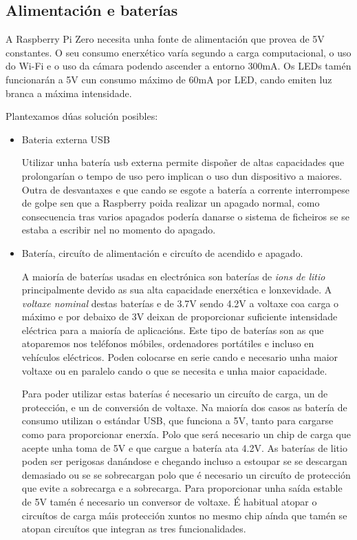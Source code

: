 \subsection{Alimentación e baterías}

A Raspberry Pi Zero necesita unha fonte de alimentación que provea de 5V constantes. O seu consumo enerxético varía segundo a carga computacional, o uso do Wi-Fi e o uso da cámara podendo ascender a entorno 300mA.
Os LEDs tamén funcionarán a 5V cun consumo máximo de 60mA por LED, cando emiten luz branca a máxima intensidade.

Plantexamos dúas solución posibles:
\begin{itemize}
    \item Bateria externa USB

Utilizar unha batería usb externa permite dispoñer de altas capacidades que prolongarían o tempo de uso pero implican o uso dun dispositivo a maiores. Outra de desvantaxes e que cando se esgote a batería a corrente interrompese de golpe sen que a Raspberry poida realizar un apagado normal, como consecuencia tras varios apagados podería danarse o sistema de ficheiros se se estaba a escribir nel no momento do apagado.

    \item Batería, circuíto de alimentación e circuíto de acendido e apagado.

A maioría de baterías usadas en electrónica son baterías de \emph{ions de litio} principalmente devido as sua alta capacidade enerxética e lonxevidade. A \emph{voltaxe nominal} destas baterías e de 3.7V sendo 4.2V a voltaxe coa carga o máximo e por debaixo de 3V deixan de proporcionar suficiente intensidade eléctrica para a maioría de aplicacións. Este tipo de baterías son as que atoparemos nos teléfonos móbiles, ordenadores portátiles e incluso en vehículos eléctricos. Poden colocarse en serie cando e necesario unha maior voltaxe ou en paralelo cando o que se necesita e unha maior capacidade.

Para poder utilizar estas baterías é necesario un circuíto de carga, un de protección, e un de conversión de voltaxe. Na maioría dos casos as batería de consumo utilizan o estándar USB, que funciona a 5V, tanto para cargarse como para proporcionar enerxía. Polo que será necesario un chip de carga que acepte unha toma de 5V e que cargue a batería ata 4.2V. As baterías de litio poden ser perigosas danándose e chegando incluso a estoupar se se descargan demasiado ou se se sobrecargan polo que é necesario un circuíto de protección que evite a sobrecarga e a sobrecarga. Para proporcionar unha saída estable de 5V tamén é necesario un conversor de voltaxe.
É habitual atopar o circuítos de carga máis protección xuntos no mesmo chip aínda que tamén se atopan circuítos que integran as tres funcionalidades.
\end{itemize}
